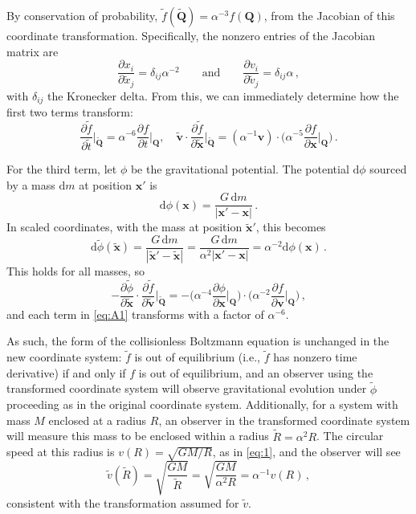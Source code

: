 \documentclass[aps,prl,reprint,superscriptaddress,nopreprintnumbers,nobibnotes,floatfix,longbibliography,footinbib]{revtex4-2}
\newcommand{\vb}[1]{\ensuremath{\mathbf{#1}}}
\newcommand{\tvb}[1]{\ensuremath{\tilde{\mathbf{#1}}}}
\begin{document}
By conservation of probability, $\tilde{f}(\tvb{Q}) = \alpha^{-3}f(\vb{Q})$, from the Jacobian of this coordinate transformation. Specifically, the nonzero entries of the Jacobian matrix are
\begin{equation}
 \frac{\partial{x_i}}{\partial{}\tilde{x}_j} = \delta_{ij}\alpha^{-2} \qquad\text{and}\qquad \frac{\partial{v_i}}{\partial{}\tilde{v}_j} = \delta_{ij} \alpha \, ,
\end{equation}
with $\delta_{ij}$ the Kronecker delta. From this, we can immediately determine how the first two terms transform:
\begin{equation}
 \frac{\partial \tilde{f}}{\partial \tilde{t}}\Big|_{\tvb{Q}} = \alpha^{-6}\frac{\partial f}{\partial t}\Big|_{\vb{Q}},\quad \tvb{v}\cdot\frac{\partial \tilde{f}}{\partial \tvb{x}}\Big|_{\tvb{Q}} = (\alpha^{-1}\vb{v})\cdot\Big(\alpha^{-5}\frac{\partial f}{\partial \vb{x}}\Big|_{\vb{Q}}\Big) \, .
\end{equation}

For the third term, let $\phi$ be the gravitational potential. The potential $\mathrm{d}\phi$ sourced by a mass $\mathrm{d}m$ at position $\vb{x}'$ is
\begin{equation}
 \mathrm{d}\phi(\vb{x}) = \frac{G\,\mathrm{d}m}{|\vb{x}' - \vb{x}|} \, .
\end{equation}
In scaled coordinates, with the mass at position $\tvb{x}'$, this becomes
\begin{equation}
 \mathrm{d}\tilde{\phi}(\tvb{x}) = \frac{G\,\mathrm{d}m}{|\tvb{x}' - \tvb{x}|} = \frac{G\,\mathrm{d}m}{\alpha^{2}|\vb{x}' - \vb{x}|} = \alpha^{-2}\mathrm{d}\phi(\vb{x}) \, .
\end{equation}
This holds for all masses, so 
\begin{equation}
 - \frac{\partial\tilde\phi}{\partial \tvb{x}} \cdot \frac{\partial \tilde f}{\partial \tvb{v}}\Big|_{\tvb{Q}} = - \Big(\alpha^{-4}\frac{\partial\phi}{\partial \vb{x}}\Big|_{\vb{Q}}\Big) \cdot \Big(\alpha^{-2}\frac{\partial f}{\partial \vb{v}}\Big|_{\vb{Q}}\Big) \, ,
\end{equation}
and each term in \autoref{eq:A1} transforms with a factor of $\alpha^{-6}$. 

As such, the form of the collisionless Boltzmann equation is unchanged in the new coordinate system: $\tilde{f}$ is out of equilibrium (i.e., $\tilde{f}$ has nonzero time derivative) if and only if $f$ is out of equilibrium, and an observer using the transformed coordinate system will observe gravitational evolution under $\tilde{\phi}$ proceeding as in the original coordinate system. Additionally, for a system with mass $M$ enclosed at a radius $R$, an observer in the transformed coordinate system will measure this mass to be enclosed within a radius $\tilde{R} = \alpha^2R$. The circular speed at this radius is $v(R) = \sqrt{GM/R}$, as in \autoref{eq:1}, and the observer will see 
\begin{equation}
 \tilde{v}(\tilde{R}) = \sqrt{\frac{GM}{\tilde{R}}} = \sqrt{\frac{GM}{\alpha^2 R}} = \alpha^{-1} v(R) \, ,
\end{equation}
consistent with the transformation assumed for $\tilde{v}$.
\end{document}
